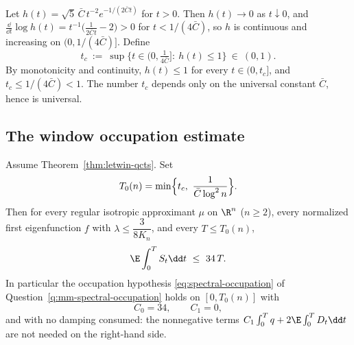 \documentclass[../main.tex]{subfiles}
\begin{document}
\begin{definition}
\label{def:sol-mwo-tc}
Let $h(t)=\sqrt5\,\bar C\,t^{-2}e^{-1/(2\bar Ct)}$ for $t>0$.  Then
$h(t)\to0$ as $t\downarrow0$, and $\frac{\dd}{\dd t}\log h(t)
=t^{-1}\bigl(\tfrac1{2\bar Ct}-2\bigr)>0$ for $t<1/(4\bar C)$, so $h$ is continuous
and increasing on $(0,1/(4\bar C)]$.  Define
\[
  t_c\ :=\ \sup\bigl\{t\in(0,\tfrac1{4\bar C}]:\ h(t)\le1\bigr\}\ \in\ (0,1).
\]
By monotonicity and continuity, $h(t)\le1$ for every $t\in(0,t_c]$, and
$t_c\le1/(4\bar C)<1$.  The number $t_c$ depends only on the universal constant
$\bar C$, hence is universal.
\end{definition}

\subsection*{The window occupation estimate}

\begin{theorem}[Window occupation with $C_0=34$, $C_1=0$; conditional on
Theorem~\ref{thm:letwin-qcts}]
\label{thm:sol-prop-mm-window-occupation}
Assume Theorem~\ref{thm:letwin-qcts}.  Set
\[
  T_0(n)=\min\Bigl\{t_c,\ \frac1{\bar C\log^2n}\Bigr\} .
\]
Then for every regular isotropic approximant $\mu$ on $\R^n$ ($n\ge2$), every
normalized first eigenfunction $f$ with
$\lambda\le\dfrac3{8K_n}$, and every $T\le T_0(n)$,
\begin{equation}
  \E\int_0^TS_t\dd t\ \le\ 34\,T .
  \label{eq:sol-mwo-occupation}
\end{equation}
In particular the occupation hypothesis \eqref{eq:spectral-occupation} of
Question~\ref{q:mm-spectral-occupation} holds on $[0,T_0(n)]$ with
\[
  C_0=34,\qquad C_1=0,
\]
and with no damping consumed: the nonnegative terms
$C_1\int_0^Tq+2\E\int_0^TD_t\dd t$ are not needed on the right-hand side.
\end{theorem}
\end{document}
